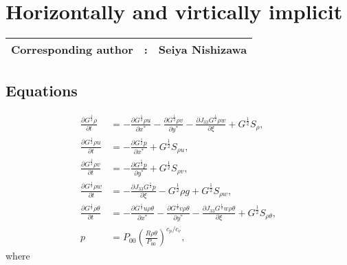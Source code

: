 \chapter{Horizontally and virtically implicit}
\label{chap:hivi}
{\bf \Large 
\begin{tabular}{ccc}
\hline
  Corresponding author & : & Seiya Nishizawa\\
\hline
\end{tabular}
}

\section{Equations}

\begin{align}
  \frac{\partial G^{\frac{1}{2}}\rho}{\partial t} &=
  -\frac{\partial G^{\frac{1}{2}}\rho u}{\partial x^*}
  -\frac{\partial G^{\frac{1}{2}}\rho v}{\partial y^*}
  -\frac{\partial J_{33}G^{\frac{1}{2}}\rho w}{\partial \xi}
  + G^{\frac{1}{2}}S_\rho, \\
  \frac{\partial G^{\frac{1}{2}}\rho u}{\partial t}
  &= -\frac{\partial G^{\frac{1}{2}}p}{\partial x^*} + G^{\frac{1}{2}}S_{\rho u}, \\
  \frac{\partial G^{\frac{1}{2}}\rho v}{\partial t}
  &= -\frac{\partial G^{\frac{1}{2}}p}{\partial y^*} + G^{\frac{1}{2}}S_{\rho v}, \\
  \frac{\partial G^{\frac{1}{2}}\rho w}{\partial t}
  &= -\frac{\partial J_{33}G^{\frac{1}{2}}p}{\partial \xi} -G^{\frac{1}{2}}\rho g + G^{\frac{1}{2}}S_{\rho w}, \\
  \frac{\partial G^{\frac{1}{2}}\rho\theta}{\partial t} &=
  -\frac{\partial G^{\frac{1}{2}}u \rho \theta}{\partial x^*}
  -\frac{\partial G^{\frac{1}{2}}v \rho \theta}{\partial y^*}
  -\frac{\partial J_{33}G^{\frac{1}{2}}w \rho \theta}{\partial \xi}
  + G^{\frac{1}{2}}S_{\rho\theta}, \\
  p &= P_{00}\left(\frac{R\rho\theta}{P_{00}}\right)^{c_p/c_v},
\end{align}
where
